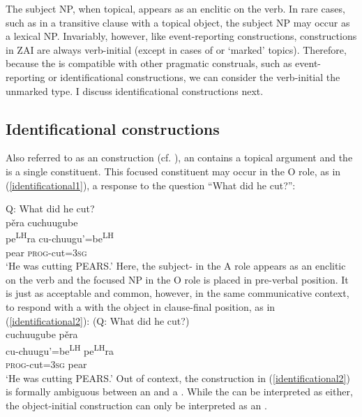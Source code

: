 The subject NP, when topical, appears as an enclitic on the verb. In rare cases, such as in a transitive clause with a topical object, the subject NP may occur as a lexical NP. Invariably, however, like event-reporting constructions,  constructions in ZAI are always verb-initial (except in cases of  or `marked' topics). Therefore, because the  is compatible with other pragmatic construals, such as event-reporting or identificational constructions, we can consider the verb-initial  the unmarked type. I discuss identificational constructions next.


\subsection{Identificational constructions}\label{identificationalsection}

Also referred to as an  construction (cf. ), an  contains a topical argument and the  is a single constituent. This focused constituent may occur in the O role, as in (\ref{identificational1}), a response to the question ``What did he cut?'':

\ea\label{identificational1} 
{Q: What did he cut?} \\
\glll p\v{e}ra cuchuugube \\
pe\textsuperscript{LH}ra cu-chuugu'=be\textsuperscript{LH} \\
pear \textsc{prog}-cut=\textsc{3sg} \\
\glt `He was cutting PEARS.'
\z
Here, the subject- in the A role appears as an enclitic on the verb and the focused NP in the O role is placed in pre-verbal position. It is just as acceptable and common, however, in the same communicative context, to respond with a  with the object in clause-final position, as in (\ref{identificational2}):
\ea\label{identificational2} 
(Q: What did he cut?) \\
\glll cuchuugube p\v{e}ra  \\
cu-chuugu'=be\textsuperscript{LH} pe\textsuperscript{LH}ra \\
\textsc{prog}-cut=\textsc{3sg} pear  \\
\glt `He was cutting PEARS.'
\z
Out of context, the construction in (\ref{identificational2}) is formally ambiguous between an  and a . While the  can be interpreted as either, the object-initial construction can only be interpreted as an .

